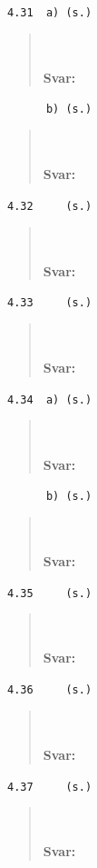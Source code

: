 \documentclass[a4paper]{article}
\newcommand{\tskcol}[1]{\textcolor{tskcol}{#1}}
\begin{document}
\texttt{\tskcol{4.31~~a) (s.)}}
\begin{quotation}
	\noindent
	\\ \\
	\textbf{Svar:}
\end{quotation}

\texttt{\tskcol{~~~~~~b) (s.)}}
\begin{quotation}
	\noindent
	\\ \\
	\textbf{Svar:}
\end{quotation}

\texttt{\tskcol{4.32~~~~ (s.)}}
\begin{quotation}
	\noindent
	\\ \\
	\textbf{Svar:}
\end{quotation}

\texttt{\tskcol{4.33~~~~ (s.)}}
\begin{quotation}
	\noindent
	\\ \\
	\textbf{Svar:}
\end{quotation}

\texttt{\tskcol{4.34~~a) (s.)}}
\begin{quotation}
	\noindent
	\\ \\
	\textbf{Svar:}
\end{quotation}

\texttt{\tskcol{~~~~~~b) (s.)}}
\begin{quotation}
	\noindent
	\\ \\
	\textbf{Svar:}
\end{quotation}

\texttt{\tskcol{4.35~~~~ (s.)}}
\begin{quotation}
	\noindent
	\\ \\
	\textbf{Svar:}
\end{quotation}

\texttt{\tskcol{4.36~~~~ (s.)}}
\begin{quotation}
	\noindent
	\\ \\
	\textbf{Svar:}
\end{quotation}

\texttt{\tskcol{4.37~~~~ (s.)}}
\begin{quotation}
	\noindent
	\\ \\
	\textbf{Svar:}
\end{quotation}
\end{document}
